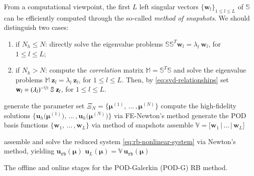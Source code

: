 \documentclass{elsarticle}
\numberwithin{equation}{section}
\theoremstyle{theorem}
\theoremstyle{definition}
\theoremstyle{remark}
\theoremstyle{proposition}
\numberwithin{figure}{section}
\newcommand{\bg}[1]{\boldsymbol{#1}}
\begin{document}
		\noindent From a computational viewpoint, the first $L$ left singular vectors $\big\lbrace \mathbf{w}_l \big\rbrace_{1 \leq l \leq L}$ of $\mathbb{S}$ can be efficiently computed through the so-called \emph{method of snapshots}. We should distinguish two cases:
		\begin{enumerate}[label=(\alph*)]
			\item if ${N_h} \leq N$: directly solve the eigenvalue problems $\mathbb{S} \mathbb{S}^T \mathbf{w}_l = \lambda_l ~ \mathbf{w}_l$, for $1 \leq l \leq L$;
			\item if ${N_h} > N$: compute the \emph{correlation} matrix $\mathbb{M} = \mathbb{S}^T \mathbb{S}$ and solve the eigenvalue problems $\mathbb{M} ~ \mathbf{z}_l = \lambda_l ~ \mathbf{z}_l$, for $1 \leq l \leq L$. Then, by \eqref{eq:svd-relationships} set $\mathbf{w}_l = (\lambda_l)^{-\nicefrac{1}{2}} ~ \mathbb{S} ~ \mathbf{z}_l$, for $1 \leq l \leq L$.
		\end{enumerate}
		
		\algrenewcommand\textproc{}
		
		\begin{algorithm}[b!]	
			\begin{algorithmic}[1]
					\State generate the parameter set $\Xi_N = \big\lbrace \bg{\mu}^{(1)}, \, \ldots \, , \bg{\mu}^{(N)} \big\rbrace$
					\State compute the high-fidelity solutions $\big\lbrace \mathbf{u}_h \big( \bg{\mu}^{(1)} \big), \, \ldots \, , \mathbf{u}_h \big( \bg{\mu}^{(N)} \big) \big\rbrace$ via FE-Newton's method
					\State generate the POD basis functions $\big\lbrace \mathbf{w}_1, \, \ldots \, , \mathbf{w}_L \big\rbrace$ via method of snapshots
					\State assemble $\mathbb{V} = \big[ \mathbf{w}_1 \, \big| \, \ldots \, \big| \, \mathbf{w}_L \big]$
				\EndFunction
				
				\vspace*{0.3cm}
				
				\setcounter{ALG@line}{0}
				
				\Function{$\mathbf{u}_L (\bg{\mu}) = $ \textsc{PODG\_online}}{$\bg{\mu}$, $\mathbb{V}$}
					\State assemble and solve the reduced system \eqref{eq:rb-nonlinear-system} via Newton's method, yielding $\mathbf{u}_{\texttt{rb}} (\bg{\mu})$
					\State $\mathbf{u}_L (\bg{\mu}) = \mathbb{V} \, \mathbf{u}_{\texttt{rb}} (\bg{\mu})$
				\EndFunction
			\end{algorithmic}
			
			\caption{The offline and online stages for the POD-Galerkin (POD-G) RB method.}
			\label{alg:pod-galerkin}
		\end{algorithm}
		
\end{document}
